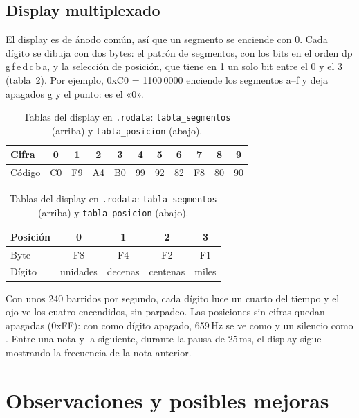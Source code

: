 \documentclass[11pt,letterpaper]{article}
\begin{document}
\subsection{Display multiplexado}

El display es de ánodo común, así que un segmento se enciende con 0. Cada dígito se dibuja con dos bytes:
el patrón de segmentos, con los bits en el orden dp\,g\,f\,e\,d\,c\,b\,a, y la selección de posición, que
tiene en 1 un solo bit entre el 0 y el 3 (tabla~\ref{tab:segmentos}). Por ejemplo, 0xC0 = 1100\,0000
enciende los segmentos a--f y deja apagados g y el punto: es el «0».

\begin{table}[H]
  \centering\small
  \caption{Tablas del display en \texttt{.rodata}: \texttt{tabla\_segmentos} (arriba) y \texttt{tabla\_posicion} (abajo).}
  \label{tab:segmentos}
  \begin{tabular}{@{}l *{10}{c}@{}}
    \toprule
    Cifra  & 0 & 1 & 2 & 3 & 4 & 5 & 6 & 7 & 8 & 9 \\
    \midrule
    Código & C0 & F9 & A4 & B0 & 99 & 92 & 82 & F8 & 80 & 90 \\
    \bottomrule
  \end{tabular}\par\medskip
  \begin{tabular}{@{}l c c c c@{}}
    \toprule
    Posición & 0 & 1 & 2 & 3 \\
    \midrule
    Byte     & F8 & F4 & F2 & F1 \\
    Dígito   & unidades & decenas & centenas & miles \\
    \bottomrule
  \end{tabular}
\end{table}

Con unos 240 barridos por segundo, cada dígito luce un cuarto del tiempo y el ojo ve los cuatro encendidos,
sin parpadeo. Las posiciones sin cifras quedan apagadas (0xFF): con \textvisiblespace{} como dígito apagado,
659\,Hz se ve como \texttt{} y un silencio como
\texttt{\textvisiblespace\textvisiblespace{}}. Entre una nota y la siguiente, durante la pausa de 25\,ms, el display sigue
mostrando la frecuencia de la nota anterior.

\section{Observaciones y posibles mejoras}
\end{document}
